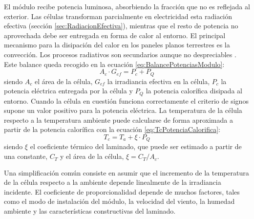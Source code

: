 El módulo recibe potencia luminosa, absorbiendo la fracción que no
es reflejada al exterior. Las células transforman parcialmente en
electricidad esta radiación efectiva (sección \ref{sec:RadiacionEfectiva}),
mientras que el resto de potencia no aprovechada debe ser entregada
en forma de calor al entorno. El principal mecanismo para la disipación
del calor en los paneles planos terrestres es la convección. Los procesos
radiativos son secundarios aunque no despreciables \cite{Luque.Hegedus2003}.
Este balance queda recogido en la ecuación \ref{eq:BalancePotenciasModulo}:
\begin{equation}
A_{c}\cdot G_{ef}=P_{c}+P_{Q}\label{eq:BalancePotenciasModulo}\end{equation}
siendo $A_{c}$ el área de la célula, $G_{ef}$ la irradiancia efectiva
en la célula, $P_{c}$ la potencia eléctrica entregada por la célula
y $P_{Q}$
la potencia calorífica disipada al entorno. Cuando la célula en cuestión
funciona correctamente el criterio de signos supone un valor positivo
para la potencia eléctrica. La temperatura de la célula respecto a
la temperatura ambiente puede calcularse de forma aproximada a partir
de la potencia calorífica con la ecuación \ref{eq:TcPotenciaCalorifica}:\begin{equation}
T_{c}=T_{a}+\xi\cdot P_{Q}\label{eq:TcPotenciaCalorifica}\end{equation}
siendo $\xi$ el coeficiente térmico del laminado, que puede ser
estimado a partir de una constante, $C_{T}$ y el área de la célula,
$\xi=C_{T}/A_{c}$. 

Una simplificación común consiste en asumir que el incremento de la
temperatura de la célula respecto a la ambiente depende linealmente
de la irradiancia incidente. El coeficiente de proporcionalidad depende
de muchos factores, tales como el modo de instalación del módulo,
la velocidad del viento, la humedad ambiente y las características
constructivas del laminado. 

